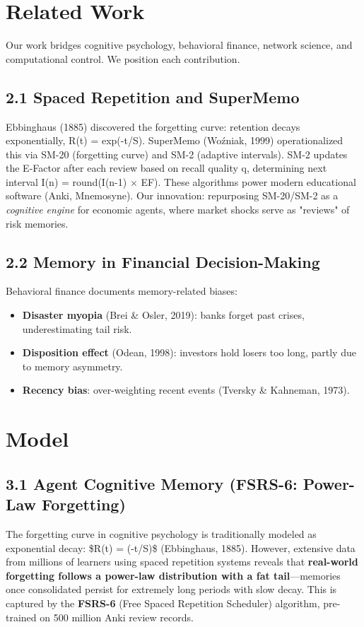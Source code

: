 \documentclass[11pt]{article}
\begin{document}
{{\section{Related Work}
Our work bridges cognitive psychology, behavioral finance, network science, and computational control. We position each contribution.

\subsection{2.1 Spaced Repetition and SuperMemo}

Ebbinghaus (1885) discovered the forgetting curve: retention decays exponentially, R(t) = exp(-t/S). SuperMemo (Woźniak, 1999) operationalized this via SM-20 (forgetting curve) and SM-2 (adaptive intervals). SM-2 updates the E-Factor after each review based on recall quality q, determining next interval I(n) = round(I(n-1) × EF). These algorithms power modern educational software (Anki, Mnemosyne). Our innovation: repurposing SM-20/SM-2 as a \textit{cognitive engine} for economic agents, where market shocks serve as "reviews" of risk memories.

\subsection{2.2 Memory in Financial Decision-Making}

Behavioral finance documents memory-related biases:
\begin{itemize}
  \item \textbf{Disaster myopia} (Brei \& Osler, 2019): banks forget past crises, underestimating tail risk.
  \item \textbf{Disposition effect} (Odean, 1998): investors hold losers too long, partly due to memory asymmetry.
  \item \textbf{Recency bias}: over-weighting recent events (Tversky \& Kahneman, 1973).
\end{itemize}


\section{Model}
\subsection{3.1 Agent Cognitive Memory (FSRS-6: Power-Law Forgetting)}

The forgetting curve in cognitive psychology is traditionally modeled as exponential decay: \$R(t) = \exp(-t/S)\$ (Ebbinghaus, 1885). However, extensive data from millions of learners using spaced repetition systems reveals that \textbf{real-world forgetting follows a power-law distribution with a fat tail}—memories once consolidated persist for extremely long periods with slow decay. This is captured by the \textbf{FSRS-6} (Free Spaced Repetition Scheduler) algorithm, pre-trained on 500 million Anki review records.

}}
\end{document}
